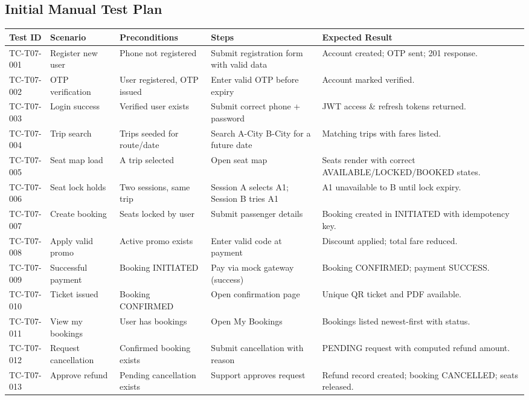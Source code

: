 \documentclass[11pt,a4paper]{article}
\newcommand{\rowstyle}{\rowcolor{headergray}}
\begin{document}
\subsection{Initial Manual Test Plan}
\begin{longtable}{p{1.9cm} p{2.4cm} p{2.4cm} Y Y}
\toprule
\rowstyle \textbf{Test ID} & \textbf{Scenario} & \textbf{Preconditions} & \textbf{Steps} & \textbf{Expected Result} \\
\midrule
\endhead
TC-T07-001 & Register new user & Phone not registered & Submit registration form with valid data & Account created; OTP sent; 201 response. \\
TC-T07-002 & OTP verification & User registered, OTP issued & Enter valid OTP before expiry & Account marked verified. \\
TC-T07-003 & Login success & Verified user exists & Submit correct phone + password & JWT access \& refresh tokens returned. \\
TC-T07-004 & Trip search & Trips seeded for route/date & Search A-City \textrightarrow{} B-City for a future date & Matching trips with fares listed. \\
TC-T07-005 & Seat map load & A trip selected & Open seat map & Seats render with correct AVAILABLE/LOCKED/BOOKED states. \\
TC-T07-006 & Seat lock holds & Two sessions, same trip & Session A selects A1; Session B tries A1 & A1 unavailable to B until lock expiry. \\
TC-T07-007 & Create booking & Seats locked by user & Submit passenger details & Booking created in INITIATED with idempotency key. \\
TC-T07-008 & Apply valid promo & Active promo exists & Enter valid code at payment & Discount applied; total fare reduced. \\
TC-T07-009 & Successful payment & Booking INITIATED & Pay via mock gateway (success) & Booking CONFIRMED; payment SUCCESS. \\
TC-T07-010 & Ticket issued & Booking CONFIRMED & Open confirmation page & Unique QR ticket and PDF available. \\
TC-T07-011 & View my bookings & User has bookings & Open My Bookings & Bookings listed newest-first with status. \\
TC-T07-012 & Request cancellation & Confirmed booking exists & Submit cancellation with reason & PENDING request with computed refund amount. \\
TC-T07-013 & Approve refund & Pending cancellation exists & Support approves request & Refund record created; booking CANCELLED; seats released. \\

\end{longtable}
\end{document}
